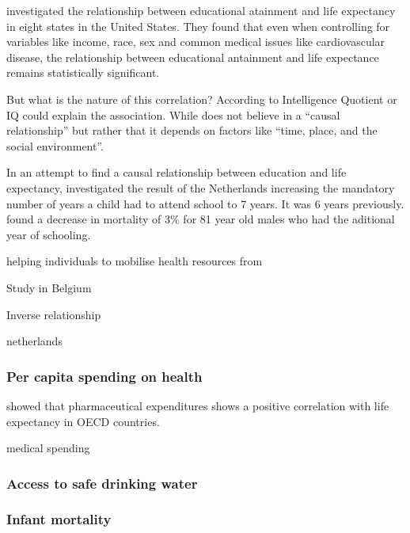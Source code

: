 \documentclass[10pt,a4paper]{article}
\begin{document}
\cite{Kaplan2015} investigated the relationship between educational atainment and life expectancy in eight states in the United States. They found that even when controlling for variables like income, race, sex and common medical issues like cardiovascular disease, the relationship between educational antainment and life expectance remains statistically significant.

But what is the nature of this correlation? According to \cite{Deary2004} Intelligence Quotient or IQ could explain the association. While \cite{Hayward2015} does not believe in a ``causal relationship'' but rather that it depends on factors like ``time, place, and the social environment''.

In an attempt to find a causal relationship between education and life expectancy, \cite{VanKippersluis2009} investigated the result of the Netherlands increasing the mandatory number of years a child had to attend school to 7 years. It was 6 years previously. \cite{VanKippersluis2009} found a decrease in mortality of 3\% for 81 year old males who had the aditional year of schooling. 


helping individuals to mobilise health resources \cite{Elo1996} from \cite{Deboosere2009}





Study in Belgium \cite{Deboosere2009}


Inverse relationship  \cite{Hoque2019}

netherlands \cite{VanKippersluis2009}

\cite{VanBaal2016a}

\subsubsection{Per capita spending on health}

\cite{Shaw2005} showed that pharmaceutical expenditures shows a positive correlation with life expectancy in OECD countries.

medical spending \cite{Cutler2006}

\subsubsection{Access to safe drinking water}

\subsubsection{Infant mortality}
\end{document}
